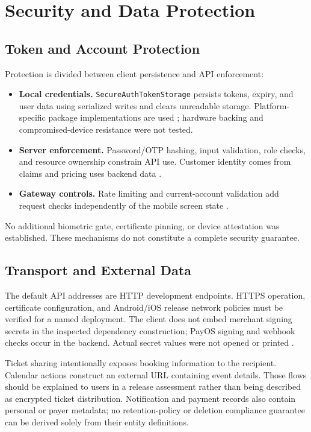 \documentclass[conference]{IEEEtran}
\newenvironment{keypoints}{\begin{itemize}\setlength{\itemsep}{2pt}%
\setlength{\parsep}{0pt}}{\end{itemize}}
\newcommand{\code}[1]{\texttt{#1}}
\begin{document}
\section{Security and Data Protection}
\subsection{Token and Account Protection}
Protection is divided between client persistence and API enforcement:
\begin{keypoints}
\item \textbf{Local credentials.} \code{SecureAuthTokenStorage} persists tokens,
expiry, and user data using serialized writes and clears unreadable storage.
Platform-specific package implementations are used \cite{client,storage};
hardware backing and compromised-device resistance were not tested.
\item \textbf{Server enforcement.} Password/OTP hashing, input validation,
role checks, and resource ownership constrain API use. Customer identity comes
from claims and pricing uses backend data \cite{auth,booking}.
\item \textbf{Gateway controls.} Rate limiting and current-account validation
add request checks independently of the mobile screen state \cite{gateway}.
\end{keypoints}
No additional biometric gate, certificate pinning, or device attestation was
established. These mechanisms do not constitute a complete security guarantee.

\subsection{Transport and External Data}
The default API addresses are HTTP development endpoints. HTTPS operation,
certificate configuration, and Android/iOS release network policies must be
verified for a named deployment. The client does not embed merchant signing
secrets in the inspected dependency construction; PayOS signing and webhook
checks occur in the backend. Actual secret values were not opened or printed
\cite{client,booking,deployment}.

Ticket sharing intentionally exposes booking information to the recipient.
Calendar actions construct an external URL containing event details. Those
flows should be explained to users in a release assessment rather than being
described as encrypted ticket distribution. Notification and payment records
also contain personal or payer metadata; no retention-policy or deletion
compliance guarantee can be derived solely from their entity definitions.
\end{document}
